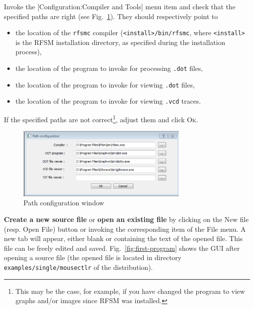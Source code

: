 \medskip
Invoke the [\textsf{Configuration:Compiler and Tools}] menu item and check that the specified paths
are right (see Fig.~\ref{fig:config-window}). They should respectively point to 
\begin{itemize}
\item the location of the \texttt{rfsmc} compiler (\verb|<install>/bin/rfsmc|, where
  \verb|<install>| is the RFSM installation directory, as specified during the installation
  process),
\item the location of the program to invoke for processing \verb|.dot| files, 
\item the location of the program to invoke for viewing \verb|.dot| files, 
\item the location of the program to invoke for viewing \verb|.vcd| traces. 
\end{itemize}
If the specified paths are not correct\footnote{This may be the case, for example, if you have
  changed the program to view graphs and/or images since RFSM was installed.}, adjust them and click \textsc{Ok}.

\begin{figure}[h]
  \centering
  \includegraphics[width=0.75\textwidth]{figs/gui/pathconfig}
  \caption{Path configuration window}
  \label{fig:config-window}
\end{figure}

\medskip \textbf{Create a new source file} or \textbf{open an existing file} by clicking on the
\textsf{New file} (resp. \textsf{Open File}) button or invoking the corresponding item of the
\textsf{File} menu. A new tab will appear, either blank or containing the text of the opened
file. This file can be freely edited and saved. Fig.~\ref{fig:first-program} shows the GUI after
opening a source file (the opened file is located in directory \texttt{examples/single/mousectlr} of
the distribution).

